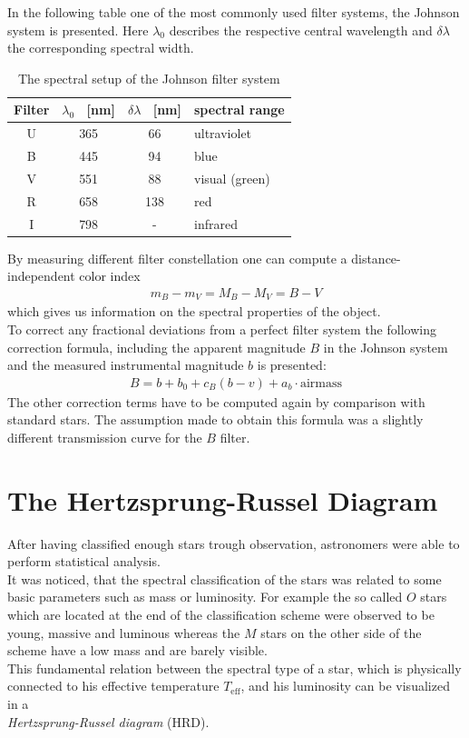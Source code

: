 In the following table one of the most commonly used filter systems, the Johnson system is presented. Here $\lambda_0$ describes the respective central wavelength and $\delta\lambda$ the corresponding spectral width. 
\begin{table}[H]
\centering
\setlength{\tabcolsep}{5mm}
\setlength\extrarowheight{2mm}
\begin{tabular}{c| c c l }

Filter & $\lambda_0$ \ [nm] & $\delta\lambda$ \ [nm] & spectral range \\ \hline 
U & 365 & 66 & ultraviolet  \\
B & 445 & 94 & blue\\
V & 551 & 88 & visual (green) \\
R & 658 & 138 & red \\
I & 798 & - & infrared \\

\end{tabular}
\caption{\label{tab:johnson} The spectral setup of the Johnson filter system \cite{Pott2017}}

\end{table}

By measuring different filter constellation one can compute a distance-independent color index
\begin{align}
	m_B - m_V = M_B - M_V = B-V
\end{align}
which gives us information on the spectral properties of the object. \\
To correct any fractional deviations from a perfect filter system the following correction formula, including the apparent magnitude $B$ in the Johnson system and the measured instrumental magnitude $b$ is presented: 
\begin{align}
	B = b + b_0 + c_B(b-v) + a_b \cdot \text{airmass}
\end{align}
The other correction terms have to be computed again by comparison with standard stars. The assumption made to obtain this formula was a slightly different transmission curve for the $B$ filter.
\section{The Hertzsprung-Russel Diagram}
After having classified enough stars trough observation, astronomers were able to perform statistical analysis. \\
It was noticed, that the spectral classification of the stars was related to some basic parameters such as mass or luminosity. For example the so called $O$ stars which are located at the end of the classification scheme were observed to be young, massive and luminous whereas the $M$ stars on the other side of the scheme have a low mass and are barely visible. \\
This fundamental relation between the spectral type of a star, which is physically connected to his effective temperature $T_{\text{eff}}$, and his luminosity can be visualized in a \\ \textit{Hertzsprung-Russel diagram} (HRD). 

